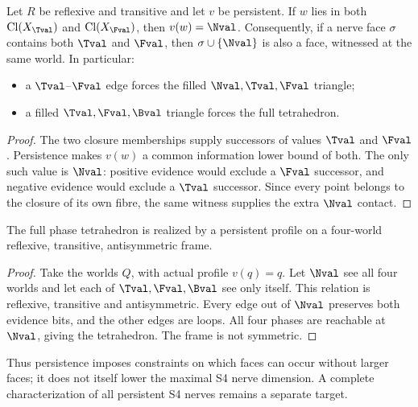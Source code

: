 \begin{theorem}
Let $R$ be reflexive and transitive and let $v$ be persistent. If $w$ lies in
both $\operatorname{Cl}(X_{\Tval})$ and $\operatorname{Cl}(X_{\Fval})$, then
$v(w)=\Nval$. Consequently, if a nerve face $\sigma$ contains both $\Tval$
and $\Fval$, then $\sigma\cup\{\Nval\}$ is also a face, witnessed at the same
world. In particular:
\begin{itemize}
\item a $\Tval$--$\Fval$ edge forces the filled $\Nval,\Tval,\Fval$ triangle;
\item a filled $\Tval,\Fval,\Bval$ triangle forces the full tetrahedron.
\end{itemize}
\end{theorem}
\begin{proof}
The two closure memberships supply successors of values $\Tval$ and $\Fval$.
Persistence makes $v(w)$ a common information lower bound of both. The only
such value is $\Nval$: positive evidence would exclude a $\Fval$ successor,
and negative evidence would exclude a $\Tval$ successor. Since every point
belongs to the closure of its own fibre, the same witness supplies the extra
$\Nval$ contact.
\end{proof}

\begin{proposition}
The full phase tetrahedron is realized by a persistent profile on a four-world
reflexive, transitive, antisymmetric frame.
\end{proposition}
\begin{proof}
Take the worlds $Q$, with actual profile $v(q)=q$. Let $\Nval$ see all four
worlds and let each of $\Tval,\Fval,\Bval$ see only itself. This relation is
reflexive, transitive and antisymmetric. Every edge out of $\Nval$ preserves
both evidence bits, and the other edges are loops. All four phases are
reachable at $\Nval$, giving the tetrahedron. The frame is not symmetric.
\end{proof}

Thus persistence imposes constraints on which faces can occur without larger
faces; it does not itself lower the maximal S4 nerve dimension. A complete
characterization of all persistent S4 nerves remains a separate target.

